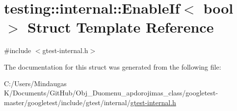 \hypertarget{structtesting_1_1internal_1_1_enable_if}{}\section{testing\+::internal\+::Enable\+If$<$ bool $>$ Struct Template Reference}
\label{structtesting_1_1internal_1_1_enable_if}


{\ttfamily \#include $<$gtest-\/internal.\+h$>$}



The documentation for this struct was generated from the following file\+:\begin{DoxyCompactItemize}
\item 
C\+:/\+Users/\+Mindaugas K/\+Documents/\+Git\+Hub/\+Obj\+\_\+\+Duomenu\+\_\+apdorojimas\+\_\+class/googletest-\/master/googletest/include/gtest/internal/\mbox{\hyperlink{googletest-master_2googletest_2include_2gtest_2internal_2gtest-internal_8h}{gtest-\/internal.\+h}}\end{DoxyCompactItemize}
